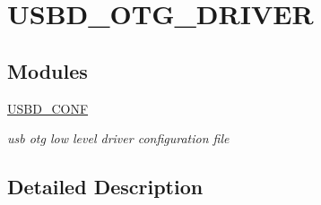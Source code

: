 \hypertarget{group__USBD__OTG__DRIVER}{}\section{U\+S\+B\+D\+\_\+\+O\+T\+G\+\_\+\+D\+R\+I\+V\+ER}
\label{group__USBD__OTG__DRIVER}
\subsection*{Modules}
\begin{DoxyCompactItemize}
\item 
\hyperlink{group__USBD__CONF}{U\+S\+B\+D\+\_\+\+C\+O\+NF}
\begin{DoxyCompactList}\small\item\em usb otg low level driver configuration file \end{DoxyCompactList}\end{DoxyCompactItemize}


\subsection{Detailed Description}
